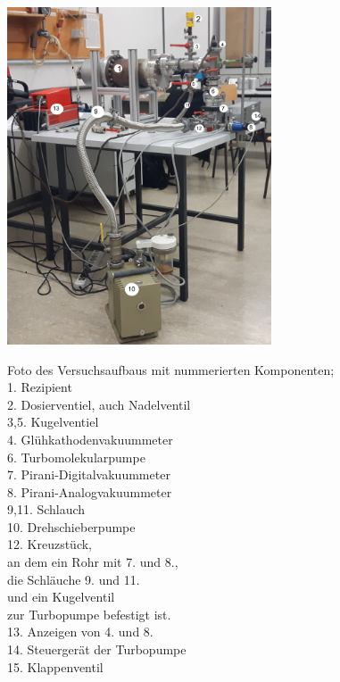 \begin{figure}
  \caption[justification=raggedleft]{Foto des Versuchsaufbaus mit nummerierten Komponenten; \\
1. Rezipient\\
2. Dosierventiel, auch Nadelventil\\
3,5. Kugelventiel \\
4. Glühkathodenvakuummeter\\
6. Turbomolekularpumpe\\
7. Pirani-Digitalvakuummeter\\
8. Pirani-Analogvakuummeter\\
9,11. Schlauch\\
10. Drehschieberpumpe\\
12. Kreuzstück, \\
an dem ein Rohr mit 7. und 8., \\
die Schläuche 9. und 11.\\
 und ein Kugelventil \\
 zur Turbopumpe befestigt ist.\\
13. Anzeigen von 4. und 8. \\
14. Steuergerät der Turbopumpe \\
15. Klappenventil \\
}
  \includegraphics[height  = 10cm]{pics/V3B2.jpg}
  \label{fig:Aufbau}
\end{figure}


